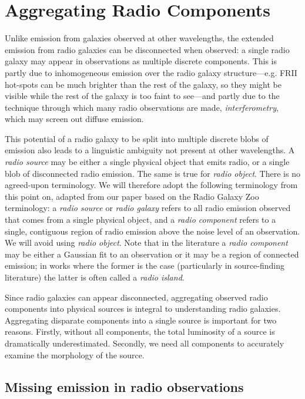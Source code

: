 \documentclass[11pt, a4paper]{book}
\newcommand{\defn}[1]{\emph{#1}}
\begin{document}
\section{Aggregating Radio Components}
\label{sec:aggregation}

    Unlike emission from galaxies observed at other wavelengths, the extended emission from radio galaxies can be disconnected when observed: a single radio galaxy may appear in observations as multiple discrete components. This is partly due to inhomogeneous emission over the radio galaxy structure---e.g. FRII hot-spots can be much brighter than the rest of the galaxy, so they might be visible while the rest of the galaxy is too faint to see---and partly due to the technique through which many radio observations are made, \defn{interferometry}, which may screen out diffuse emission.

    This potential of a radio galaxy to be split into multiple discrete blobs of emission also leads to a linguistic ambiguity not present at other wavelengths. A \defn{radio source} may be either a single physical object that emits radio, or a single blob of disconnected radio emission. The same is true for \defn{radio object}. There is no agreed-upon terminology. We will therefore adopt the following terminology from this point on, adapted from our paper \citep{alger18radio} based on the Radio Galaxy Zoo terminology: a \defn{radio source} or \defn{radio galaxy} refers to all radio emission observed that comes from a single physical object, and a \defn{radio component} refers to a single, contiguous region of radio emission above the noise level of an observation. We will avoid using \defn{radio object}. Note that in the literature a \defn{radio component} may be either a Gaussian fit to an observation or it may be a region of connected emission; in works where the former is the case (particularly in source-finding literature) the latter is often called a \defn{radio island}.

    Since radio galaxies can appear disconnected, aggregating observed radio components into physical sources is integral to understanding radio galaxies. Aggregating disparate components into a single source is important for two reasons. Firstly, without all components, the total luminosity of a source is dramatically underestimated. Secondly, we need all components to accurately examine the morphology of the source.

    \subsection{Missing emission in radio observations}
    \label{sec:missing-emission}
\end{document}
